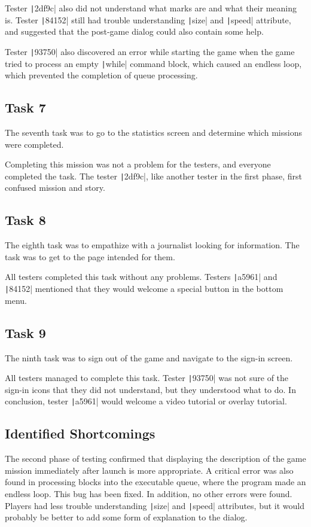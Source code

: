 Tester \texttt|2df9c| also did not understand what marks are and what their meaning is.
Tester \texttt|84152| still had trouble understanding \texttt|size| and \texttt|speed| attribute, and suggested that the post-game dialog could also contain some help.

Tester \texttt|93750| also discovered an error while starting the game when the game tried to process an empty \texttt|while| command block, which caused an endless loop, which prevented the completion of queue processing.

\subsection*{Task 7}

The seventh task was to go to the statistics screen and determine which missions were completed.

Completing this mission was not a problem for the testers, and everyone completed the task.
The tester \texttt|2df9c|, like another tester in the first phase, first confused mission and story.

\subsection*{Task 8}

The eighth task was to empathize with a journalist looking for information.
The task was to get to the page intended for them.

All testers completed this task without any problems.
Testers \texttt|a5961| and \texttt|84152| mentioned that they would welcome a special button in the bottom menu.

\subsection*{Task 9}

The ninth task was to sign out of the game and navigate to the sign-in screen.

All testers managed to complete this task.
Tester \texttt|93750| was not sure of the sign-in icons that they did not understand, but they understood what to do.
In conclusion, tester \texttt|a5961| would welcome a video tutorial or overlay tutorial.

\subsection*{Identified Shortcomings}

The second phase of testing confirmed that displaying the description of the game mission immediately after launch is more appropriate.
A critical error was also found in processing blocks into the executable queue, where the program made an endless loop.
This bug has been fixed.
In addition, no other errors were found.
Players had less trouble understanding \texttt|size| and \texttt|speed| attributes, but it would probably be better to add some form of explanation to the dialog.
